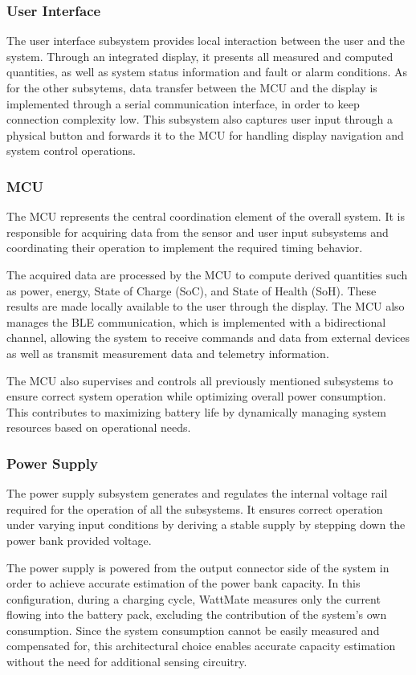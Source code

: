 \subsubsection{User Interface}

The user interface subsystem provides local interaction between the user and the system. Through an integrated display, it presents all measured and computed quantities, as well as system status information and fault or alarm conditions.
As for the other subsytems, data transfer between the MCU and the display is implemented through a serial communication interface, in order to keep connection complexity low.
This subsystem also captures user input through a physical button and forwards it to the MCU for handling display navigation and system control operations.


\subsubsection{MCU}

The MCU represents the central coordination element of the overall system. It is responsible for acquiring data from the sensor and user input subsystems and coordinating their operation to implement the required timing behavior.

The acquired data are processed by the MCU to compute derived quantities such as power, energy, State of Charge (SoC), and State of Health (SoH). These results are made locally available to the user through the display. The MCU also manages the BLE communication, which is implemented with a bidirectional channel, allowing the system to receive commands and data from external devices as well as transmit measurement data and telemetry information.

The MCU also supervises and controls all previously mentioned subsystems to ensure correct system operation while optimizing overall power consumption. This contributes to maximizing battery life by dynamically managing system resources based on operational needs.



\subsubsection{Power Supply}

The power supply subsystem generates and regulates the internal voltage rail required for the operation of all the subsystems. It ensures correct operation under varying input conditions by deriving a stable supply by stepping down the power bank provided voltage.

The power supply is powered from the output connector side of the system in order to achieve accurate estimation of the power bank capacity. In this configuration, during a charging cycle, WattMate measures only the current flowing into the battery pack, excluding the contribution of the system's own consumption. Since the system consumption cannot be easily measured and compensated for, this architectural choice enables accurate capacity estimation without the need for additional sensing circuitry.
